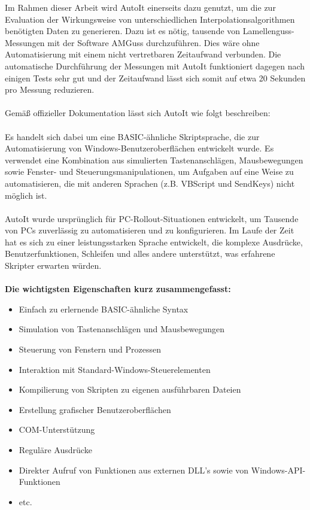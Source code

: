 \documentclass[
fontsize=10pt, 
listof = totoc,
parskip = half	
]{report}
\begin{document}
Im Rahmen dieser Arbeit wird AutoIt einerseits dazu genutzt, um die zur Evaluation der Wirkungsweise von unterschiedlichen Interpolationsalgorithmen benötigten Daten zu generieren. Dazu ist es nötig, tausende von Lamellenguss-Messungen mit der Software AMGuss durchzuführen. Dies wäre ohne Automatisierung mit einem nicht vertretbaren Zeitaufwand verbunden. Die automatische Durchführung der Messungen mit AutoIt funktioniert dagegen nach einigen Tests sehr gut und der Zeitaufwand lässt sich somit auf etwa 20 Sekunden pro Messung reduzieren.
\\\\
\noindent Gemäß offizieller Dokumentation \cite{AutoItDocs} lässt sich AutoIt wie folgt beschreiben:
\\\\
\noindent Es handelt sich dabei um eine BASIC-ähnliche Skriptsprache, die zur Automatisierung von Windows-Benutzeroberflächen entwickelt wurde. Es verwendet eine Kombination aus simulierten Tastenanschlägen, Mausbewegungen sowie Fenster- und Steuerungsmanipulationen, um Aufgaben auf eine Weise zu automatisieren, die mit anderen Sprachen (z.B. VBScript und SendKeys) nicht möglich ist.
\\\\
\noindent AutoIt wurde ursprünglich für PC-Rollout-Situationen entwickelt, um Tausende von PCs zuverlässig zu automatisieren und zu konfigurieren. Im Laufe der Zeit hat es sich zu einer leistungsstarken Sprache entwickelt, die komplexe Ausdrücke, Benutzerfunktionen, Schleifen und alles andere unterstützt, was erfahrene Skripter erwarten würden. 
\\\\
\textbf{Die wichtigsten Eigenschaften kurz zusammengefasst:}
\begin{itemize}
	\item Einfach zu erlernende BASIC-ähnliche Syntax
	\item Simulation von Tastenanschlägen und Mausbewegungen
	\item Steuerung von Fenstern und Prozessen
	\item Interaktion mit Standard-Windows-Steuerelementen
	\item Kompilierung von Skripten zu eigenen ausführbaren Dateien
	\item Erstellung grafischer Benutzeroberflächen
	\item COM-Unterstützung
	\item Reguläre Ausdrücke
	\item Direkter Aufruf von Funktionen aus externen DLL's sowie von Windows-API-Funktionen
	\item etc.
\end{itemize}
\end{document}
